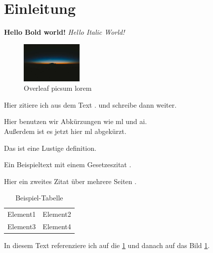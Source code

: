 \documentclass[../main.tex]{subfiles}
\begin{document}
\section{Einleitung}

\textbf{Hello Bold world!} %
\textit{Hello Italic World!} %

\begin{figure}[h]
    \centering
    \includegraphics[width=3cm]{images/picsum lorem.jpg} %
    \caption{Overleaf picsum lorem} %
    \label{fig:picsum_lorem} %
\end{figure}

Hier zitiere ich aus dem Text \autocite[10]{smith2018}. und schreibe dann weiter.\par %

Hier benutzen wir Abkürzungen wie \gls{ml} und \gls{ai}.\\ %
Außerdem ist es jetzt hier \gls{ml} abgekürzt.\par %


\begin{definition}
Das ist eine Lustige definition.
\end{definition}

Ein Beispieltext mit einem Gesetzeszitat . %

Hier ein zweites Zitat über mehrere Seiten \autocite[15-27]{johnson2020}. %

\medskip

\begin{table}[h]
    \centering
    \begin{tabular}{cc}
        Element1 & Element2\\
        Element3 & Element4\\
    \end{tabular}
    \caption{Beispiel-Tabelle} %
    \label{tab:example_table} %
\end{table}

In diesem Text referenziere ich auf die  \cref{tab:example_table} und danach auf das Bild \cref{fig:picsum_lorem}.
\end{document}

